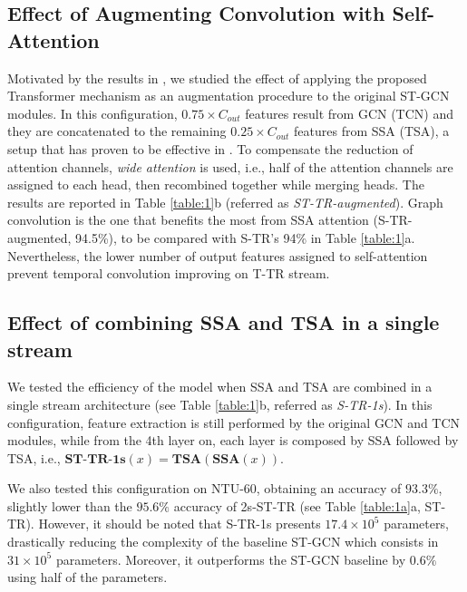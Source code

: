 \documentclass[times,twocolumn,final,authoryear]{elsarticle}
\begin{document}
\subsection{Effect of Augmenting Convolution with Self-Attention} 
Motivated by the results in \cite{DBLP:journals/corr/abs-1904-09925}, we studied the effect of applying the proposed Transformer mechanism as an augmentation procedure to the original ST-GCN modules. In this configuration, $0.75 \times C_{out}$ features result from GCN (TCN) and they are concatenated to the remaining $0.25 \times C_{out}$ features from SSA (TSA), a setup that
has proven to be effective in \cite{DBLP:journals/corr/abs-1904-09925}. To compensate the reduction of attention channels, \textit{wide attention} is used, i.e., half of the attention channels are assigned to each head, then recombined together while merging heads. The results are reported in Table \ref{table:1}b (referred as \textit{ST-TR-augmented}). Graph convolution is the one that benefits the most from SSA attention (S-TR-augmented, 94.5\%), to be compared with S-TR's 94\% in Table \ref{table:1}a. Nevertheless, the lower number of output features assigned to self-attention prevent temporal convolution improving on T-TR stream. 


\subsection{Effect of combining SSA and TSA in a single stream}
We tested the efficiency of the model when SSA and TSA are combined in a single stream architecture (see Table \ref{table:1}b, referred as \textit{S-TR-1s}). In this configuration, feature extraction is still performed by the original GCN and TCN modules, while from the 4th layer on, each layer is composed by SSA followed by TSA, i.e., $\textbf{ST-TR-1s}(x)=\textbf{TSA}(\textbf{SSA}(x))$.

We also tested this configuration on NTU-60, obtaining an accuracy of $93.3\%$, slightly lower than the $95.6\%$ accuracy of 2s-ST-TR (see Table \ref{table:1a}a, ST-TR). However, it should be noted that S-TR-1s presents $17.4 \times 10^5$ parameters, drastically reducing the complexity of the baseline ST-GCN which consists in $31 \times 10^5$ parameters. Moreover, it outperforms the ST-GCN baseline by $0.6\%$ using half of the parameters.
\end{document}
